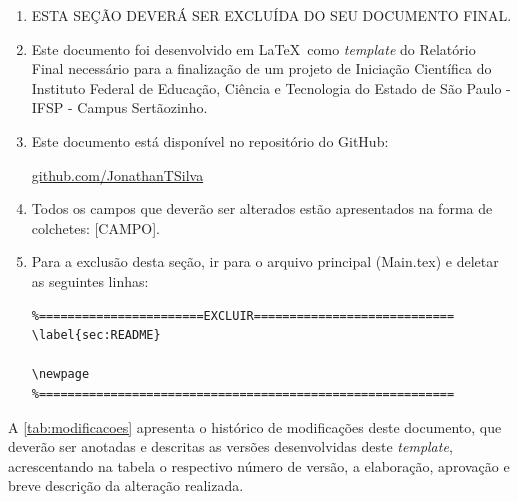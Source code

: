 \documentclass[../Main.tex]{subfiles}
\begin{document}
        \begin{enumerate}
            \item {\color{red} ESTA SEÇÃO DEVERÁ SER EXCLUÍDA DO SEU DOCUMENTO FINAL.}
            
            \item Este documento foi desenvolvido em \LaTeX\ como \textit{template} do Relatório Final necessário para a finalização de um projeto de Iniciação Científica do Instituto Federal de Educação, Ciência e Tecnologia do Estado de São Paulo - IFSP - Campus Sertãozinho.
            
            \item Este documento está disponível no repositório do GitHub:
            
            \begin{center}
                \href{https://github.com/JonathanTSilva}{github.com/JonathanTSilva}
            \end{center}
            
            \item Todos os campos que deverão ser alterados estão apresentados na forma de colchetes: [CAMPO].
            
            \item Para a exclusão desta seção, ir para o arquivo principal  (Main.tex) e deletar as seguintes linhas:
            
\begin{verbatim}
%=======================EXCLUIR============================
\label{sec:README}

\newpage
%==========================================================
\end{verbatim}
        \end{enumerate}
         
        A \autoref{tab:modificacoes} apresenta o histórico de modificações deste documento, que deverão ser anotadas e descritas as versões desenvolvidas deste \textit{template}, acrescentando na tabela o respectivo número de versão, a elaboração, aprovação e breve descrição da alteração realizada.
        
\end{document}
